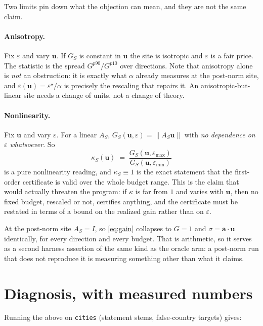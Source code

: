 \documentclass[11pt]{article}
\newcommand{\va}{\bm{a}}
\newcommand{\vu}{\bm{u}}
\newcommand{\norm}[1]{\left\lVert #1 \right\rVert}
\begin{document}
Two limits pin down what the objection can mean, and they are not the same claim.

\paragraph{Anisotropy.} Fix $\varepsilon$ and vary $\vu$. If
$G_S$ is constant in $\vu$ the site is isotropic and $\varepsilon$ is a fair price. The
statistic is the spread $G^{p90}/G^{p10}$ over directions. Note that anisotropy alone is
\emph{not} an obstruction: it is exactly what $\alpha$ already measures at the post-norm
site, and $\varepsilon(\vu) = \varepsilon^\star/\alpha$ is precisely the rescaling that
repairs it. An anisotropic-but-linear site needs a change of units, not a change of
theory.

\paragraph{Nonlinearity.} Fix $\vu$ and vary $\varepsilon$. For a linear
$A_S$, $G_S(\vu,\varepsilon) = \norm{A_S\vu}$ with \emph{no dependence on
$\varepsilon$ whatsoever}. So
\begin{equation}\label{eq:scaledep}
  \kappa_S(\vu) \;=\; \frac{G_S(\vu,\varepsilon_{\max})}{G_S(\vu,\varepsilon_{\min})}
\end{equation}
is a pure nonlinearity reading, and $\kappa_S \equiv 1$ is the exact statement that the
first-order certificate is valid over the whole budget range. This is the claim that
would actually threaten the program: if $\kappa$ is far from $1$ and varies with $\vu$,
then no fixed budget, rescaled or not, certifies anything, and the certificate must be
restated in terms of a bound on the realized gain rather than on $\varepsilon$.

At the post-norm site $A_S = I$, so \eqref{eq:gain} collapses to $G = 1$ and $\sigma =
\va\cdot\vu$ identically, for every direction and every budget. That is arithmetic, so
it serves as a second harness assertion of the same kind as the oracle arm: a post-norm
run that does not reproduce it is measuring something other than what it claims.

\section{Diagnosis, with measured numbers}\label{sec:diag}

Running the above on \texttt{cities} (statement stems, false-country targets) gives:
\end{document}
